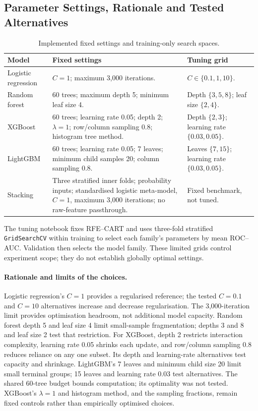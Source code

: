 \subsection{Parameter Settings, Rationale and Tested Alternatives}
\label{subsec:parameter-settings}

\begin{table}[H]
\centering
\small
\caption{Implemented fixed settings and training-only search spaces.}
\label{tab:python-parameters}
\begin{tabularx}{\textwidth}{@{}p{2.5cm}XX@{}}
\toprule
Model & Fixed settings & Tuning grid \\
\midrule
Logistic regression &
$C=1$; maximum 3,000 iterations. &
$C\in\{0.1,1,10\}$. \\
Random forest &
60 trees; maximum depth 5; minimum leaf size 4. &
Depth $\{3,5,8\}$; leaf size $\{2,4\}$. \\
XGBoost &
60 trees; learning rate 0.05; depth 2; $\lambda=1$; row/column sampling 0.8;
histogram tree method. &
Depth $\{2,3\}$; learning rate $\{0.03,0.05\}$. \\
LightGBM &
60 trees; learning rate 0.05; 7 leaves; minimum child samples 20;
column sampling 0.8. &
Leaves $\{7,15\}$; learning rate $\{0.03,0.05\}$. \\
Stacking &
Three stratified inner folds; probability inputs; standardised logistic
meta-model, $C=1$, maximum 3,000 iterations; no raw-feature passthrough. &
Fixed benchmark, not tuned. \\
\bottomrule
\end{tabularx}
\end{table}

The tuning notebook fixes RFE--CART and uses three-fold stratified
\texttt{GridSearchCV} within training to select each family's parameters by
mean ROC--AUC. Validation then selects the model family. These limited grids
control experiment scope; they do not establish globally optimal settings.


\paragraph{Rationale and limits of the choices.}
Logistic regression's $C=1$ provides a regularised reference; the tested
$C=0.1$ and $C=10$ alternatives increase and decrease regularisation.
The 3,000-iteration limit provides optimisation headroom, not additional
model capacity. Random forest depth 5 and leaf size 4 limit small-sample
fragmentation; depths 3 and 8 and leaf size 2 test that restriction.
For XGBoost, depth 2 restricts interaction complexity, learning rate 0.05
shrinks each update, and row/column sampling 0.8 reduces reliance on any one
subset. Its depth and learning-rate alternatives test capacity and shrinkage.
LightGBM's 7 leaves and minimum child size 20 limit small terminal groups;
15 leaves and learning rate 0.03 test alternatives. The shared 60-tree budget
bounds computation; its optimality was not tested. XGBoost's $\lambda=1$
and histogram method, and the sampling fractions, remain fixed controls
rather than empirically optimised choices.

